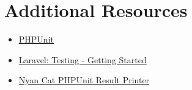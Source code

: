 \section{Additional Resources}

\begin{itemize}[leftmargin=*]
    \item \href{https://github.com/sebastianbergmann/phpunit}{PHPUnit}
    \item \href{http://laravel.com/docs/6.x/testing}{Laravel: Testing - Getting Started}
    \item \href{https://github.com/JeroenDeDauw/nyancat-phpunit-resultprinter}{Nyan Cat PHPUnit Result Printer}
\end{itemize}
